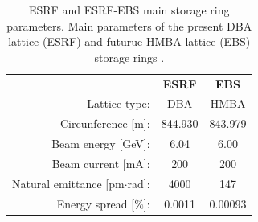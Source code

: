 \documentclass{iucr}              %
\newcommand{\todo}[1]{{\color{red}[TODO: "#1'']}}
\begin{document}
\begin{table}\label{tab:TableSources}
    \caption{ESRF and ESRF-EBS main storage ring parameters. Main parameters of the present DBA lattice (ESRF) and futurue HMBA lattice (EBS) storage rings \cite{ESRF2014}.}
        \begin{tabular}{rcc}
                                              & \textbf{ESRF} & \textbf{EBS}      \\ 
        Lattice type:                         & DBA           & HMBA              \\
        Circunference {[}m{]}:                & 844.930       & 843.979           \\
        Beam energy {[}GeV{]}:                & 6.04          & 6.00              \\
        Beam current {[}mA{]}:                & 200           & 200               \\
        Natural emittance {[}pm$\cdot$rad{]}: & 4000          & 147               \\
        Energy spread {[}$\%${]}:             & 0.0011        & 0.00093           \\       
    \end{tabular}
\end{table}

\begin{table}\label{tab:eBeam}
    \centering
    \caption{ESRF and EBS main electron beam parameters. Electron beam parameters for the high-$\beta$ (ESRF) and the EBS straight sections. Values taken at the symmetry point of the straight section, where the insertion devices are placed. Values fir ESRF are taken from \cite{ESRF2014}. For EBS, two (very close) design values are used, from Ref.~\cite{ESRF2014} labelled EBS-S28A, and those coming from further lattice refinement, labelled EBS-S28D. \todo{Remove ESRF-AT?? Check again} }
\end{table}
\end{document}
